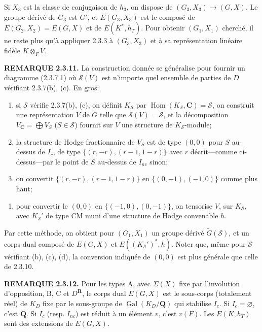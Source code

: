 \documentclass[10pt,a4paper]{article}
\providecommand{\tightlist}{\setlength{\itemsep}{0pt}\setlength{\parskip}{0pt}}
\newcommand{\SourcePage}[2]{\clearpage\setcounter{page}{#2}\typeout{D031_SOURCE_PAGE physical=#1 printed=#2}}
\begin{document}
Si \(X_3\) est la classe de conjugaison de \(h_3\), on dispose de \((G_3,X_3)\to(G,X)\). Le groupe dérivé de \(G_3\) est \(\widetilde G'\), et \(E(G_3,X_3)\) est le composé de \(E(G_2,X_2)=E(G,X)\) et de \(E(K^*,h_T)\). Pour obtenir \((G_1,X_1)\) cherché, il ne reste plus qu'à appliquer 2.3.3 à \((G_3,X_3)\) et à sa représentation linéaire fidèle \(K\otimes_F V\).

\textbf{REMARQUE 2.3.11.} La construction donnée se généralise pour fournir un diagramme (2.3.7.1) où \(\mathscr S(V)\) est n'importe quel ensemble de parties de \(D\) vérifiant 2.3.7(b), (c). En gros:

\begin{enumerate}
\def\labelenumi{(\alph{enumi})}
\item
  si \(\mathscr S\) vérifie 2.3.7(b), (c), on définit \(K_{\mathscr S}\) par \(\operatorname{Hom}(K_{\mathscr S},\mathbf C)=\mathscr S\), on construit une représentation \(V\) de \(\widetilde G\) telle que \(\mathscr S(V)=\mathscr S\), et la décomposition \(V_{\mathbf C}=\bigoplus V_S\) (\(S\in\mathscr S\)) fournit sur \(V\) une structure de \(K_{\mathscr S}\)-module;
\item
  la structure de Hodge fractionnaire de \(V_S\) est de type \((0,0)\) pour \(S\) au-dessus de \(I_c\), de type \(\{(r,-r),(r-1,1-r)\}\) avec \(r\) décrit---comme ci-dessus---par le point de \(S\) au-dessus de \(I_{nc}\) sinon;
\item
  on convertit \(\{(r,-r),(r-1,1-r)\}\) en \(\{(0,-1),(-1,0)\}\) comme plus haut;
\end{enumerate}

\SourcePage{28}{274}
\begin{enumerate}
\def\labelenumi{(\alph{enumi})}
\setcounter{enumi}{3}
\tightlist
\item
  pour convertir le \((0,0)\) en \(\{(-1,0),(0,-1)\}\), on tensorise \(V\), sur \(K_{\mathscr S}\), avec \(K_{\mathscr S}'\) de type CM muni d'une structure de Hodge convenable \(h\).
\end{enumerate}

Par cette méthode, on obtient pour \((G_1,X_1)\) un groupe dérivé \(\widetilde G(\mathscr S)\), et un corps dual composé de \(E(G,X)\) et \(E((K_{\mathscr S}')^*,h)\). Noter que, même pour \(\mathscr S\) vérifiant (b), (c), (d), la conversion indiquée de \((0,0)\) est plus générale que celle de 2.3.10.

\textbf{REMARQUE 2.3.12.} Pour les types A, avec \(\Sigma(X)\) fixe par l'involution d'opposition, B, C et \(D^{\mathbf R}\), le corps dual \(E(G,X)\) est le sous-corps (totalement réel) de \(K_D\) fixe par le sous-groupe de \(\operatorname{Gal}(K_D/\mathbf Q)\) qui stabilise \(I_c\). Si \(I_c=\varnothing\), c'est \(\mathbf Q\). Si \(I_c\) (resp. \(I_{nc}\)) est réduit à un élément \(v\), c'est \(v(F)\). Les \(E(K,h_T)\) sont des extensions de \(E(G,X)\).
\end{document}
